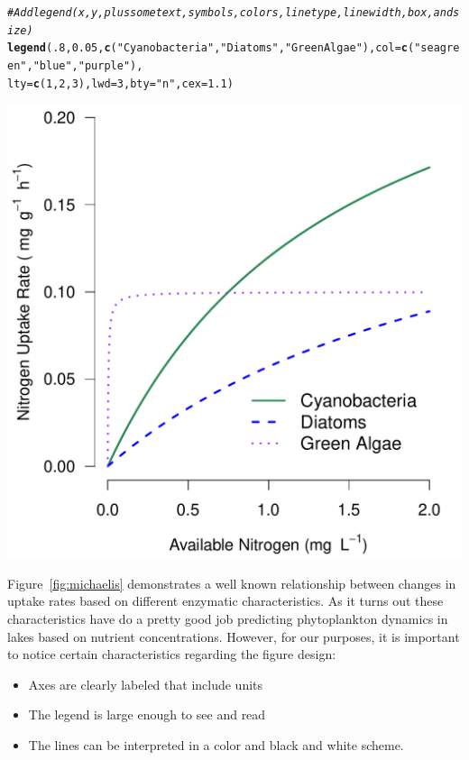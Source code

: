 \documentclass{tufte-handout}\usepackage[]{graphicx}\usepackage[]{color}
\makeatletter
\def\maxwidth{ %
  \ifdim\Gin@nat@width>\linewidth
    \linewidth
  \else
    \Gin@nat@width
  \fi
}
\newcommand{\hlnum}[1]{\textcolor[rgb]{0.686,0.059,0.569}{#1}}%
\newcommand{\hlstr}[1]{\textcolor[rgb]{0.192,0.494,0.8}{#1}}%
\newcommand{\hlcom}[1]{\textcolor[rgb]{0.678,0.584,0.686}{\textit{#1}}}%
\newcommand{\hlstd}[1]{\textcolor[rgb]{0.345,0.345,0.345}{#1}}%
\newcommand{\hlkwc}[1]{\textcolor[rgb]{0.333,0.667,0.333}{#1}}%
\newcommand{\hlkwd}[1]{\textcolor[rgb]{0.737,0.353,0.396}{\textbf{#1}}}%
\newenvironment{kframe}{%
 \def\at@end@of@kframe{}%
 \ifinner\ifhmode%
  \def\at@end@of@kframe{\end{minipage}}%
  \begin{minipage}{\columnwidth}%
 \fi\fi%
 \def\FrameCommand##1{\hskip\@totalleftmargin \hskip-\fboxsep
 \colorbox{shadecolor}{##1}\hskip-\fboxsep
     \hskip-\linewidth \hskip-\@totalleftmargin \hskip\columnwidth}%
 \MakeFramed {\advance\hsize-\width
   \@totalleftmargin\z@ \linewidth\hsize
   \@setminipage}}%
 {\par\unskip\endMakeFramed%
 \at@end@of@kframe}
\newenvironment{knitrout}{}{} %
\makeatother
\begin{document}
\begin{knitrout}
\begin{kframe}
\begin{alltt}
\hlcom{# Add legend(x, y, plus some text, symbols, colors, line type, line width, box, and size)}
\hlkwd{legend}\hlstd{(}\hlnum{.8}\hlstd{,} \hlnum{0.05}\hlstd{,} \hlkwd{c}\hlstd{(}\hlstr{"Cyanobacteria"}\hlstd{,} \hlstr{"Diatoms"}\hlstd{,} \hlstr{"Green Algae"}\hlstd{),} \hlkwc{col}\hlstd{=}\hlkwd{c}\hlstd{(}\hlstr{"seagreen"}\hlstd{,} \hlstr{"blue"}\hlstd{,} \hlstr{"purple"}\hlstd{),}
\hlkwc{lty}\hlstd{=}\hlkwd{c}\hlstd{(}\hlnum{1}\hlstd{,}\hlnum{2}\hlstd{,}\hlnum{3}\hlstd{),} \hlkwc{lwd}\hlstd{=}\hlnum{3}\hlstd{,} \hlkwc{bty}\hlstd{=}\hlstr{"n"}\hlstd{,} \hlkwc{cex}\hlstd{=}\hlnum{1.1}\hlstd{)}
\end{alltt}
\end{kframe}
\includegraphics[width=\maxwidth]{figure/a-1} 
\end{knitrout}

Figure~\ref{fig:michaelis} demonstrates a well known relationship between changes in uptake rates based on different enzymatic characteristics. As it turns out these characteristics have do a pretty good job predicting phytoplankton dynamics in lakes based on nutrient concentrations. However, for our purposes, it is important to notice certain characteristics regarding the figure design:

\begin{itemize}
	\item Axes are clearly labeled that include units
	\item The legend is large enough to see and read
	\item The lines can be interpreted in a color and black and white scheme.
\end{itemize}
\end{document}

